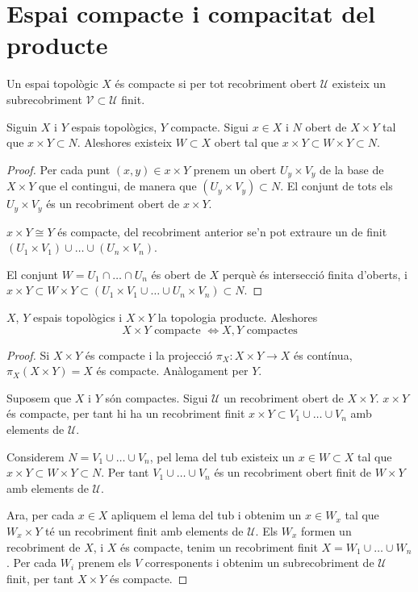 \section{Espai compacte i compacitat del producte}

\begin{defi}
	Un espai topològic $X$ és compacte si per tot recobriment obert $\mathcal{U}$ existeix un subrecobriment $\mathcal{V}\subset\mathcal{U}$ finit.
\end{defi}

\begin{lema}
	Siguin $X$ i $Y$ espais topològics, $Y$ compacte. Sigui $x\in X$ i $N$ obert de $X \times Y$ tal que $x\times Y \subset N$.
	Aleshores existeix $W \subset X$ obert tal que $x\times Y \subset W \times Y \subset N$.
\end{lema}
\begin{proof}
	Per cada punt $(x,y) \in x\times Y$ prenem un obert $U_y\times V_y$ de la base de $X\times Y$ que el contingui, de manera que $(U_y\times V_y) \subset N$. El conjunt de tots els $U_y\times V_y$ és un recobriment obert de $x\times Y$.

	$x \times Y \cong Y$ és compacte, del recobriment anterior se'n pot extraure un de finit $(U_1 \times V_1) \cup\dots\cup (U_n \times V_n)$.

	El conjunt $W = U_1 \cap\dots\cap U_n$ és obert de $X$ perquè és intersecció finita d'oberts, i $x \times Y \subset W\times Y \subset (U_1 \times V_1 \cup\dots\cup U_n \times V_n) \subset N$.
\end{proof}

\begin{prop}
	$X$, $Y$ espais topològics i $X \times Y$ la topologia producte. Aleshores
	\[X \times Y \text{ compacte } \Longleftrightarrow X,Y \text{ compactes}\]
\end{prop}
\begin{proof}
	Si $X \times Y$ és compacte i la projecció $\pi_X\!: X \times Y \rightarrow X$ és contínua, $\pi_X(X\times Y)=X$ és compacte. Anàlogament per $Y$.

	\quad

	Suposem que $X$ i $Y$ són compactes. Sigui $\mathcal{U}$ un recobriment obert de $X \times Y$. $x \times Y$ és compacte, per tant hi ha un recobriment finit $x \times Y \subset V_1 \cup\dots\cup V_n$ amb elements de $\mathcal{U}$.

	Considerem $N = V_1 \cup\dots\cup V_n$, pel lema del tub existeix un $x \in W \subset X$ tal que $x\times Y \subset W \times Y \subset N$. Per tant $V_1 \cup\dots\cup  V_n$ és un recobriment obert finit de $W \times Y$ amb elements de $\mathcal{U}$.

	Ara, per cada $x\in X$ apliquem el lema del tub i obtenim un $x \in W_x$ tal que $W_x \times Y$ té un recobriment finit amb elements de $\mathcal{U}$. Els $W_x$ formen un recobriment de $X$, i $X$ és compacte, tenim un recobriment finit $X = W_1 \cup\dots\cup W_n$. Per cada $W_i$ prenem els $V$ corresponents i obtenim un subrecobriment de $\mathcal{U}$ finit, per tant $X\times Y$ és compacte.

\end{proof}


